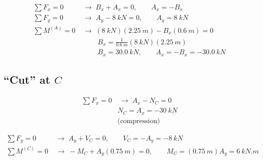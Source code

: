 \documentclass[11pt]{article}
\begin{document}
\begin{align*}
  \textstyle\sum F_x = 0 &\;\rightarrow\; B_x + A_x = 0, \qquad A_x = -B_x \\
  \textstyle\sum F_y = 0 &\;\rightarrow\; A_y - \SI{8}{kN} = 0, \qquad \boxed{A_y = \SI{8}{kN}} \\
  \textstyle\sum M^{(A)} = 0 &\;\rightarrow\; (\SI{8}{kN})(\SI{2.25}{m}) - B_x(\SI{0.6}{m}) = 0 \\
  &\;\phantom{\rightarrow}\;\; B_x = \frac{1}{\SI{0.6}{m}}(\SI{8}{kN})(\SI{2.25}{m}) \\
  &\;\phantom{\rightarrow}\;\; \boxed{B_x = \SI{30.0}{kN}}, \qquad \boxed{A_x = -B_x = -\SI{30.0}{kN}}
\end{align*}

\subsection*{``Cut'' at $C$}

\noindent
\begin{minipage}[c]{0.5\textwidth}
\centering
{}
\end{minipage}%
\hfill
\begin{minipage}[c]{0.46\textwidth}
\begin{align*}
  \textstyle\sum F_x = 0 &\;\rightarrow\; A_x - N_C = 0 \\
  &\boxed{N_C = A_x = -\SI{30}{kN}} \\
  &\text{(compression)}
\end{align*}
\end{minipage}

\begin{align*}
  \textstyle\sum F_y = 0 &\;\rightarrow\; A_y + V_C = 0, \qquad
     \boxed{V_C = -A_y = -\SI{8}{kN}} \\
  \textstyle\sum M^{(C)} = 0 &\;\rightarrow\; -M_C + A_y(\SI{0.75}{m}) = 0, \qquad
     \boxed{M_C = (\SI{0.75}{m})A_y = \SI{6}{kN.m}}
\end{align*}
\end{document}
